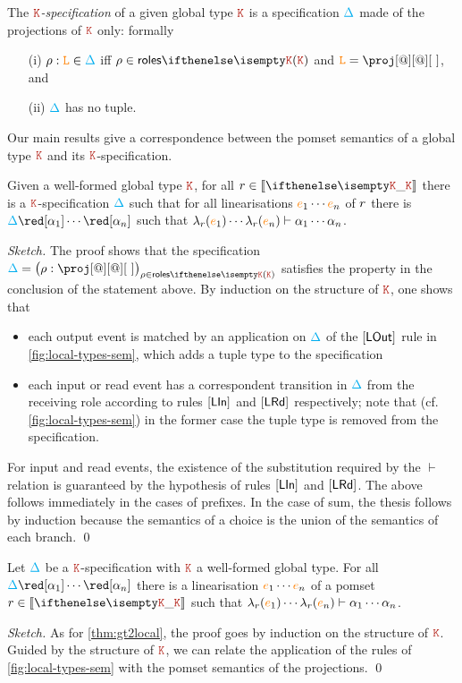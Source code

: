 The \emph{$\aK$-specification} of a given global type $\aK$ is a
specification $\textcolor{cyan}{\Delta}$ made of the projections of $\aK$ only: formally
\begin{itemize}
\item[(i)] $\rho : \texttt{\textcolor{orange}L} \in \textcolor{cyan}{\Delta}$ iff $\arole \in \roles{\aK}$ and
  $\aL = \proj[@][@][\ ]$, and
\item[(ii)] $\textcolor{cyan}{\Delta}$ has no tuple.
\end{itemize}
%
Our main results give a correspondence between the pomset semantics of
a global type $\aK$ and its $\aK$-specification.
%
\begin{theorem}\label{thm:gt2local}
  Given a well-formed global type $\aK$, for all $\apom \in \ksem \aK$
  there is a $\aK$-specification $\textcolor{cyan}{\Delta}$ such that for all
  linearisations ${\color{orange}{e}}_1 \cdots {\color{orange}{e}}_n$ of $r$ there is
  $\envmv \red[\alpha_1] \cdots \red[\alpha_n]$ such that
  $\lambda_{r}({\color{orange}{e}}_1) \cdots \lambda_{r}({\color{orange}{e}}_n) \vdash \alpha_1
  \cdots \alpha_n$.
\end{theorem}
\begin{proof}[Sketch]
  The proof shows that the specification
  $\envmv = \big(\arole : \proj[@][@][\ ]\big)_{\arole \in \roles{\aK}}$
  satisfies the property in the conclusion of the statement above.
  By induction on the structure of $\aK$, one shows that
  \begin{itemize}
  \item each output event is matched by an application on $\textcolor{cyan}{\Delta}$ of the
    $\mathsf{[LOut]}$ rule in \cref{fig:local-types-sem},
    which adds a tuple type to the specification
  \item each input or read event has a correspondent transition in
    $\textcolor{cyan}{\Delta}$ from the receiving role according to rules $\mathsf{[LIn]}$
    and $\mathsf{[LRd]}$ respectively; note that (cf.
    \cref{fig:local-types-sem}) in the former case the
    tuple type is removed from the specification.
  \end{itemize}
  For input and read events, the existence of the substitution
  required by the $\vdash$ relation is guaranteed by the hypothesis of
  rules $\mathsf{[LIn]}$ and $\mathsf{[LRd]}$.  The above follows immediately
  in the cases of prefixes.
  In the case of sum, the thesis follows by induction
  because the semantics of a choice is the union of the semantics
  of each branch.
  \qed
\end{proof}
%
\begin{theorem}\label{thm:local2gt}
  Let $\textcolor{cyan}{\Delta}$ be a $\aK$-specification with $\aK$ a well-formed
  global type.
  For all $\envmv \red[\alpha_1] \cdots \red[\alpha_n]$ there is a
  linearisation ${\color{orange}{e}}_1 \cdots {\color{orange}{e}}_n$ of a pomset $\apom \in \ksem \aK$
  such that
  $\lambda_{r}({\color{orange}{e}}_1) \cdots \lambda_{r}({\color{orange}{e}}_n) \vdash \alpha_1
  \cdots \alpha_n$.
\end{theorem}
\begin{proof}[Sketch]
  As for \cref{thm:gt2local}, the proof goes by induction on the
  structure of $\aK$.
  Guided by the structure of $\aK$, we can relate the application of
  the rules of \cref{fig:local-types-sem} with the pomset semantics
  of the projections.  
  \qed
\end{proof}
